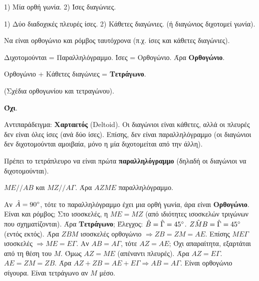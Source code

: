 \documentclass[11pt,a4paper,modern]{FFExercises}
\begin{document}
\begin{alist}
    \item 1) Μία ορθή γωνία. 2) Ίσες διαγώνιες.
    \item 1) Δύο διαδοχικές πλευρές ίσες. 2) Κάθετες διαγώνιες. (ή διαγώνιος διχοτομεί γωνία).
    \item Να είναι ορθογώνιο και ρόμβος ταυτόχρονα (π.χ. ίσες και κάθετες διαγώνιες).
\end{alist}

\begin{alist}
    \item Διχοτομούνται = Παραλληλόγραμμο. Ίσες = Ορθογώνιο. Άρα \textbf{Ορθογώνιο}.
    \item Ορθογώνιο + Κάθετες διαγώνιες = \textbf{Τετράγωνο}.
    \item (Σχέδια ορθογωνίου και τετραγώνου).
\end{alist}

\begin{alist}
    \item \textbf{Όχι}.
    \item Αντιπαράδειγμα: \textbf{Χαρταετός} (Deltoid). Οι διαγώνιοι είναι κάθετες, αλλά οι πλευρές δεν είναι όλες ίσες (ανά δύο ίσες). Επίσης, δεν είναι παραλληλόγραμμο (οι διαγώνιοι δεν διχοτομούνται αμοιβαία, μόνο η μία διχοτομείται από την άλλη).
    \item Πρέπει το τετράπλευρο να είναι πρώτα \textbf{παραλληλόγραμμο} (δηλαδή οι διαγώνιοι να διχοτομούνται).
\end{alist}

\begin{alist}
    \item $ME // AB$ και $MZ // A\varGamma$. Άρα $AZME$ παραλληλόγραμμο.
    \item Αν $\hat{A}=90\degree$, τότε το παραλληλόγραμμο έχει μια ορθή γωνία, άρα είναι \textbf{Ορθογώνιο}. Είναι και ρόμβος; Στο ισοσκελές, η $ME = MZ$ (από ιδιότητες ισοσκελών τριγώνων που σχηματίζονται). Άρα \textbf{Τετράγωνο};
    Έλεγχος: $\hat{B}=\hat{\Gamma}=45\degree$. $\hat{ZMB} = \hat{\Gamma} = 45\degree$ (εντός εκτός). Άρα $ZBM$ ισοσκελές ορθογώνιο $\Rightarrow ZB=ZM=AE$. Επίσης $ME\varGamma$ ισοσκελές $\Rightarrow ME=E\varGamma$.
    Αν $AB=A\varGamma$, τότε $AZ=AE$; Όχι απαραίτητα, εξαρτάται από τη θέση του $M$.
    Όμως $AZ = ME$ (απέναντι πλευρές). Άρα $AZ = E\varGamma$.
    $AE = ZM = ZB$.
    Άρα $AZ+ZB = AE+E\varGamma \Rightarrow AB=A\varGamma$.
    Είναι ορθογώνιο σίγουρα. Είναι τετράγωνο αν $M$ μέσο.
\end{alist}
\end{document}

